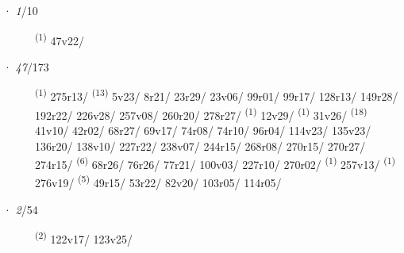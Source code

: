 \ENTRYEND
\noindent{} · \textit{1}/10 \LEMMALINE
\begin{description}
    \item[]  \textsuperscript{(1)} \mbox{47v22/}
\end{description}
\ENTRYEND
\noindent{} · \textit{47}/173 \LEMMALINE
\begin{description}
    \item[]  \textsuperscript{(1)} \mbox{275r13/} \CASEBREAK {} \textsuperscript{(13)} \mbox{5v23/} \mbox{8r21/} \mbox{23r29/} \mbox{23v06/} \mbox{99r01/} \mbox{99r17/} \mbox{128r13/} \mbox{149r28/} \mbox{192r22/} \mbox{226v28/} \mbox{257v08/} \mbox{260r20/} \mbox{278r27/} \textsuperscript{(1)} \mbox{12v29/} \textsuperscript{(1)} \mbox{31v26/} \textsuperscript{(18)} \mbox{41v10/} \mbox{42r02/} \mbox{68r27/} \mbox{69v17/} \mbox{74r08/} \mbox{74r10/} \mbox{96r04/} \mbox{114v23/} \mbox{135v23/} \mbox{136r20/} \mbox{138v10/} \mbox{227r22/} \mbox{238v07/} \mbox{244r15/} \mbox{268r08/} \mbox{270r15/} \mbox{270r27/} \mbox{274r15/} \textsuperscript{(6)} \mbox{68r26/} \mbox{76r26/} \mbox{77r21/} \mbox{100v03/} \mbox{227r10/} \mbox{270r02/} \textsuperscript{(1)} \mbox{257v13/} \textsuperscript{(1)} \mbox{276v19/} \CASEBREAK {} \textsuperscript{(5)} \mbox{49r15/} \mbox{53r22/} \mbox{82v20/} \mbox{103r05/} \mbox{114r05/}
\end{description}
\ENTRYEND
\noindent{} · \textit{2}/54 \LEMMALINE
\begin{description}
    \item[]  \textsuperscript{(2)} \mbox{122v17/} \mbox{123v25/}
\end{description}
